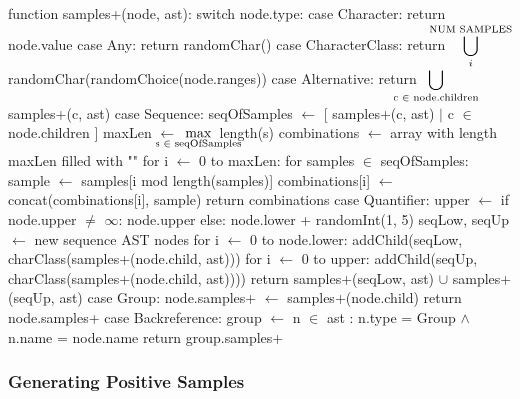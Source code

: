 \begin{pseudoCode}[float=htb,title={Generating positive test samples},label=code:verificationPositive]
function samples+(node, ast):
  switch node.type:
    case Character: %
      return { node.value }
    case Any:
      return { randomChar() } %
    case CharacterClass: %
      return ${\displaystyle \hspace{-1.5em}\bigcup_{i}^\text{NUM SAMPLES}}\hspace{-1.5em}$ randomChar(randomChoice(node.ranges)) %
    case Alternative: %
      return ${\displaystyle \hspace{-2em}\bigcup_{\text{c }\in\text{ node.children}}\hspace{-2em}}$ samples+(c, ast) %
    case Sequence:  %
      seqOfSamples $\gets$ [ samples+(c, ast) $\mid$ c $\in$ node.children ]
      maxLen $\gets$ ${\displaystyle \hspace{-2em}\max_{\text{s } \in \text{ seqOfSamples}}}\hspace{-2em}$  length(s)
      combinations $\gets$ array with length maxLen filled with ""
      for i $\gets$ 0 to maxLen:
        for samples $\in$ seqOfSamples:
          sample $\gets$ samples[i mod length(samples)]
          combinations[i] $\gets$ concat(combinations[i], sample)
      return combinations %
    case Quantifier: %
      upper $\gets$ if node.upper $\neq$ $\infty$:
                 node.upper 
               else: node.lower + randomInt(1, 5) 
      seqLow, seqUp $\gets$ new sequence AST nodes %
      for i $\gets$ 0 to node.lower:
        addChild(seqLow, charClass(samples+(node.child, ast)))
      for i $\gets$ 0 to upper:
        addChild(seqUp, charClass(samples+(node.child, ast))))
      return samples+(seqLow, ast) $\cup$ samples+(seqUp, ast) %
    case Group: %
        node.samples+ $\gets$ samples+(node.child)        
        return node.samples+
    case Backreference:
      group $\gets$ n $\in$ ast : n.type = Group $\land$ n.name = node.name
      return group.samples+ %
\end{pseudoCode}

\subsubsection{Generating Positive Samples}

